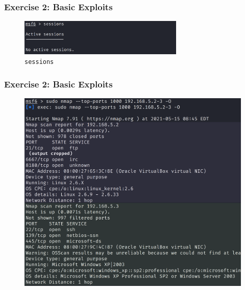 \documentclass[handout]{beamer}
\begin{document}
\begin{frame}
	\frametitle{Exercise 2: Basic Exploits}
	
	
	\begin{figure}
	    \centering
	    \includegraphics[width=0.7\textwidth]{../drawable/exercise_2_screenshots/sessions_empty.PNG}
	    \caption{\texttt{sessions}}
	\end{figure}
\end{frame}

\begin{frame}
	\frametitle{Exercise 2: Basic Exploits}
	\begin{figure}
	    \centering
	    \includegraphics[width=0.96\textheight]{../drawable/exercise_2_screenshots/db_nmap_v2.png}
	\end{figure}
\end{frame}
\end{document}
